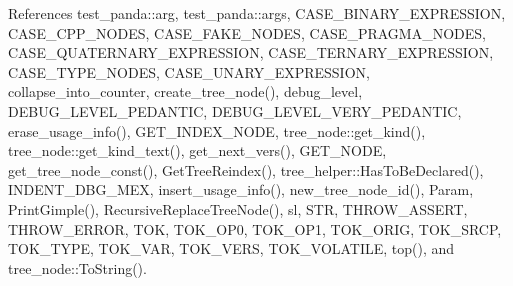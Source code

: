 References test\+\_\+panda\+::arg, test\+\_\+panda\+::args, C\+A\+S\+E\+\_\+\+B\+I\+N\+A\+R\+Y\+\_\+\+E\+X\+P\+R\+E\+S\+S\+I\+ON, C\+A\+S\+E\+\_\+\+C\+P\+P\+\_\+\+N\+O\+D\+ES, C\+A\+S\+E\+\_\+\+F\+A\+K\+E\+\_\+\+N\+O\+D\+ES, C\+A\+S\+E\+\_\+\+P\+R\+A\+G\+M\+A\+\_\+\+N\+O\+D\+ES, C\+A\+S\+E\+\_\+\+Q\+U\+A\+T\+E\+R\+N\+A\+R\+Y\+\_\+\+E\+X\+P\+R\+E\+S\+S\+I\+ON, C\+A\+S\+E\+\_\+\+T\+E\+R\+N\+A\+R\+Y\+\_\+\+E\+X\+P\+R\+E\+S\+S\+I\+ON, C\+A\+S\+E\+\_\+\+T\+Y\+P\+E\+\_\+\+N\+O\+D\+ES, C\+A\+S\+E\+\_\+\+U\+N\+A\+R\+Y\+\_\+\+E\+X\+P\+R\+E\+S\+S\+I\+ON, collapse\+\_\+into\+\_\+counter, create\+\_\+tree\+\_\+node(), debug\+\_\+level, D\+E\+B\+U\+G\+\_\+\+L\+E\+V\+E\+L\+\_\+\+P\+E\+D\+A\+N\+T\+IC, D\+E\+B\+U\+G\+\_\+\+L\+E\+V\+E\+L\+\_\+\+V\+E\+R\+Y\+\_\+\+P\+E\+D\+A\+N\+T\+IC, erase\+\_\+usage\+\_\+info(), G\+E\+T\+\_\+\+I\+N\+D\+E\+X\+\_\+\+N\+O\+DE, tree\+\_\+node\+::get\+\_\+kind(), tree\+\_\+node\+::get\+\_\+kind\+\_\+text(), get\+\_\+next\+\_\+vers(), G\+E\+T\+\_\+\+N\+O\+DE, get\+\_\+tree\+\_\+node\+\_\+const(), Get\+Tree\+Reindex(), tree\+\_\+helper\+::\+Has\+To\+Be\+Declared(), I\+N\+D\+E\+N\+T\+\_\+\+D\+B\+G\+\_\+\+M\+EX, insert\+\_\+usage\+\_\+info(), new\+\_\+tree\+\_\+node\+\_\+id(), Param, Print\+Gimple(), Recursive\+Replace\+Tree\+Node(), sl, S\+TR, T\+H\+R\+O\+W\+\_\+\+A\+S\+S\+E\+RT, T\+H\+R\+O\+W\+\_\+\+E\+R\+R\+OR, T\+OK, T\+O\+K\+\_\+\+O\+P0, T\+O\+K\+\_\+\+O\+P1, T\+O\+K\+\_\+\+O\+R\+IG, T\+O\+K\+\_\+\+S\+R\+CP, T\+O\+K\+\_\+\+T\+Y\+PE, T\+O\+K\+\_\+\+V\+AR, T\+O\+K\+\_\+\+V\+E\+RS, T\+O\+K\+\_\+\+V\+O\+L\+A\+T\+I\+LE, top(), and tree\+\_\+node\+::\+To\+String().


